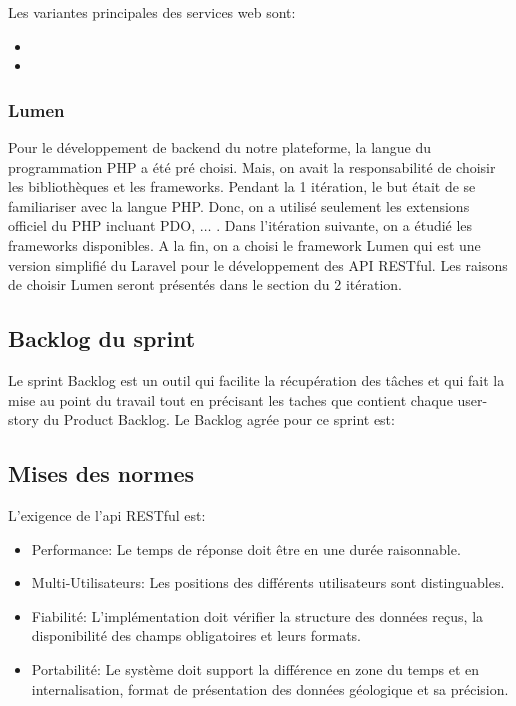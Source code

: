 Les variantes principales des services web sont:
\begin{itemize}
        \item {}
        \item {}
\end{itemize}


\subsubsection{Lumen}

Pour le développement de backend du notre plateforme, la langue du programmation
PHP a été pré choisi. Mais, on avait la responsabilité de choisir les
bibliothèques et les frameworks. Pendant la 1\iere{} itération, le but était de
se familiariser avec la langue PHP. Donc, on a utilisé seulement les extensions
officiel du PHP incluant PDO, $\dotsc$ . Dans l'itération suivante, on a étudié
les frameworks disponibles. A la fin, on a choisi le framework Lumen qui est
une version simplifié du Laravel pour le développement des API RESTful. Les
raisons de choisir Lumen seront présentés dans le section du 2\ieme{} itération.

\subsection{Backlog du sprint}

Le sprint Backlog est un outil qui facilite la récupération des tâches et qui fait
la mise au point du travail tout en précisant les taches que contient chaque
user-story du Product Backlog.
Le Backlog agrée pour ce sprint est:


\subsection{Mises des normes}

L'exigence de l'api RESTful est:
\begin{itemize}
    \item Performance: Le temps de réponse doit être en une durée raisonnable.
    \item Multi-Utilisateurs: Les positions des différents utilisateurs sont
        distinguables.
    \item Fiabilité: L'implémentation doit vérifier la structure des données
        reçus, la disponibilité des champs obligatoires et leurs formats.
    \item Portabilité: Le système doit support la différence en zone du temps
        et en internalisation, format de présentation des données géologique et
        sa précision.
\end{itemize}

